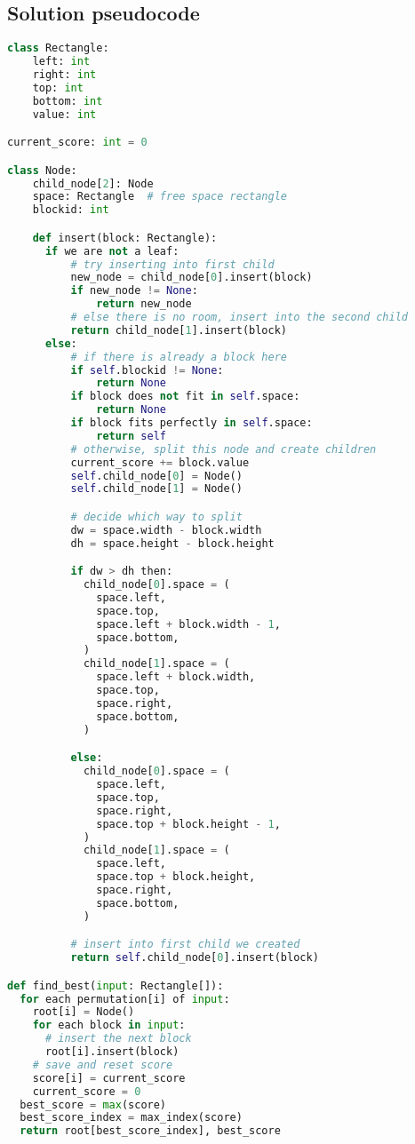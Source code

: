 \subsection{Solution pseudocode}
\begin{lstlisting}[language=Python, caption=Python-style pseudocode]
class Rectangle:
    left: int
    right: int
    top: int
    bottom: int
    value: int

current_score: int = 0

class Node:
    child_node[2]: Node
    space: Rectangle  # free space rectangle
    blockid: int

    def insert(block: Rectangle):
      if we are not a leaf:
          # try inserting into first child
          new_node = child_node[0].insert(block)
          if new_node != None:
              return new_node
          # else there is no room, insert into the second child
          return child_node[1].insert(block)
      else:
          # if there is already a block here
          if self.blockid != None:
              return None
          if block does not fit in self.space:
              return None
          if block fits perfectly in self.space:
              return self
          # otherwise, split this node and create children
          current_score += block.value
          self.child_node[0] = Node()
          self.child_node[1] = Node()

          # decide which way to split
          dw = space.width - block.width
          dh = space.height - block.height

          if dw > dh then:
            child_node[0].space = (
              space.left,
              space.top,
              space.left + block.width - 1,
              space.bottom,
            )
            child_node[1].space = (
              space.left + block.width,
              space.top,
              space.right,
              space.bottom,
            )

          else:
            child_node[0].space = (
              space.left,
              space.top,
              space.right,
              space.top + block.height - 1,
            )
            child_node[1].space = (
              space.left,
              space.top + block.height,
              space.right,
              space.bottom,
            )

          # insert into first child we created
          return self.child_node[0].insert(block)

def find_best(input: Rectangle[]):
  for each permutation[i] of input:
    root[i] = Node()
    for each block in input:
      # insert the next block
      root[i].insert(block)
    # save and reset score
    score[i] = current_score
    current_score = 0
  best_score = max(score)
  best_score_index = max_index(score)
  return root[best_score_index], best_score
\end{lstlisting}

